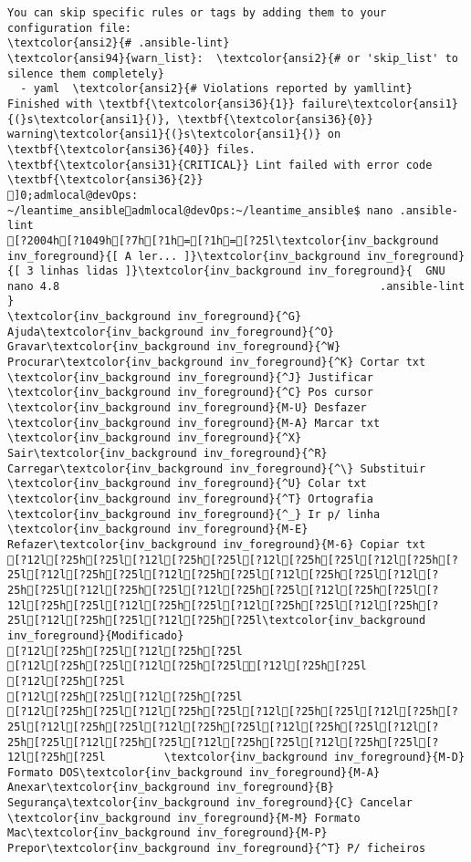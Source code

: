 \documentclass{scrartcl}
\begin{document}
\begin{Verbatim}
You can skip specific rules or tags by adding them to your configuration file:
\textcolor{ansi2}{# .ansible-lint}
\textcolor{ansi94}{warn_list}:  \textcolor{ansi2}{# or 'skip_list' to silence them completely}
  - yaml  \textcolor{ansi2}{# Violations reported by yamllint}
Finished with \textbf{\textcolor{ansi36}{1}} failure\textcolor{ansi1}{(}s\textcolor{ansi1}{)}, \textbf{\textcolor{ansi36}{0}} warning\textcolor{ansi1}{(}s\textcolor{ansi1}{)} on \textbf{\textcolor{ansi36}{40}} files.
\textbf{\textcolor{ansi31}{CRITICAL}} Lint failed with error code \textbf{\textcolor{ansi36}{2}}
]0;admlocal@devOps: ~/leantime_ansibleadmlocal@devOps:~/leantime_ansible$ nano .ansible-lint 
[?2004h[?1049h[?7h[?1h=[?1h=[?25l\textcolor{inv_background inv_foreground}{[ A ler... ]}\textcolor{inv_background inv_foreground}{[ 3 linhas lidas ]}\textcolor{inv_background inv_foreground}{  GNU nano 4.8                                                 .ansible-lint                                                              }
\textcolor{inv_background inv_foreground}{^G} Ajuda\textcolor{inv_background inv_foreground}{^O} Gravar\textcolor{inv_background inv_foreground}{^W} Procurar\textcolor{inv_background inv_foreground}{^K} Cortar txt    \textcolor{inv_background inv_foreground}{^J} Justificar    \textcolor{inv_background inv_foreground}{^C} Pos cursor    \textcolor{inv_background inv_foreground}{M-U} Desfazer     \textcolor{inv_background inv_foreground}{M-A} Marcar txt
\textcolor{inv_background inv_foreground}{^X} Sair\textcolor{inv_background inv_foreground}{^R} Carregar\textcolor{inv_background inv_foreground}{^\} Substituir    \textcolor{inv_background inv_foreground}{^U} Colar txt     \textcolor{inv_background inv_foreground}{^T} Ortografia    \textcolor{inv_background inv_foreground}{^_} Ir p/ linha   \textcolor{inv_background inv_foreground}{M-E} Refazer\textcolor{inv_background inv_foreground}{M-6} Copiar txt
[?12l[?25h[?25l[?12l[?25h[?25l[?12l[?25h[?25l[?12l[?25h[?25l[?12l[?25h[?25l[?12l[?25h[?25l[?12l[?25h[?25l[?12l[?25h[?25l[?12l[?25h[?25l[?12l[?25h[?25l[?12l[?25h[?25l[?12l[?25h[?25l[?12l[?25h[?25l[?12l[?25h[?25l[?12l[?25h[?25l[?12l[?25h[?25l[?12l[?25h[?25l\textcolor{inv_background inv_foreground}{Modificado}
[?12l[?25h[?25l[?12l[?25h[?25l
[?12l[?25h[?25l[?12l[?25h[?25l[?12l[?25h[?25l
[?12l[?25h[?25l
[?12l[?25h[?25l[?12l[?25h[?25l
[?12l[?25h[?25l[?12l[?25h[?25l[?12l[?25h[?25l[?12l[?25h[?25l[?12l[?25h[?25l[?12l[?25h[?25l[?12l[?25h[?25l[?12l[?25h[?25l[?12l[?25h[?25l[?12l[?25h[?25l[?12l[?25h[?25l[?12l[?25h[?25l         \textcolor{inv_background inv_foreground}{M-D} Formato DOS\textcolor{inv_background inv_foreground}{M-A} Anexar\textcolor{inv_background inv_foreground}{B} Segurança\textcolor{inv_background inv_foreground}{C} Cancelar           \textcolor{inv_background inv_foreground}{M-M} Formato Mac\textcolor{inv_background inv_foreground}{M-P} Prepor\textcolor{inv_background inv_foreground}{^T} P/ ficheiros

\end{Verbatim}
\end{document}
